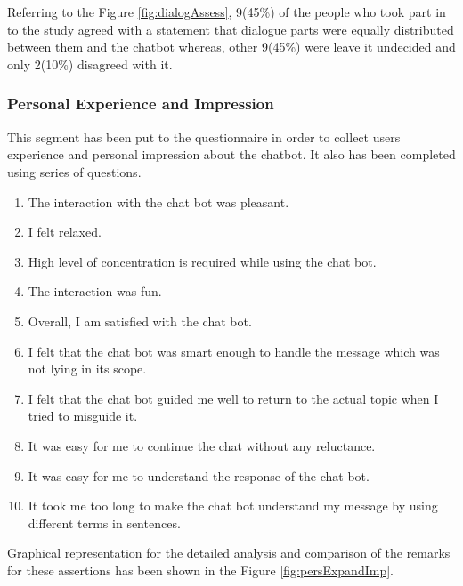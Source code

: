 \\~\\
Referring to the Figure \ref{fig:dialogAssess}, 9(45\%) of the people who took part in to the study agreed with a statement that dialogue parts were equally distributed between them and the chatbot whereas, other 9(45\%) were leave it undecided and only 2(10\%) disagreed with it.


\subsubsection*{Personal Experience and Impression}
This segment has been put to the questionnaire in order to collect users experience and personal impression about the chatbot. It also has been completed using series of questions. 
\begin{enumerate}
    \item The interaction with the chat bot was pleasant.
    \item I felt relaxed.
    \item High level of concentration is required while using the chat bot.
    \item The interaction was fun.
    \item Overall, I am satisfied with the chat bot.
    \item I felt that the chat bot was smart enough to handle the message which was not lying in its scope.
    \item I felt that the chat bot guided me well to return to the actual topic when I tried to misguide it.
    \item It was easy for me to continue the chat without any reluctance.
    \item It was easy for me to understand the response of the chat bot.
    \item It took me too long to make the chat bot understand my message by using different terms in sentences.
\end{enumerate}
Graphical representation for the detailed analysis and comparison of the remarks for these assertions has been shown in the Figure \ref{fig:persExpandImp}.

